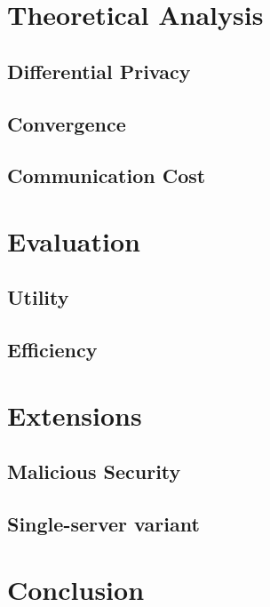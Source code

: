 \documentclass[sigconf,balance=false]{acmart}
\begin{document}
\section{Theoretical Analysis}

\subsection{Differential Privacy}

\subsection{Convergence}

\subsection{Communication Cost}

\section{Evaluation}

\subsection{Utility}

\subsection{Efficiency}

\section{Extensions}
\subsection{Malicious Security}

\subsection{Single-server variant}

\section{Conclusion}






\end{document}
